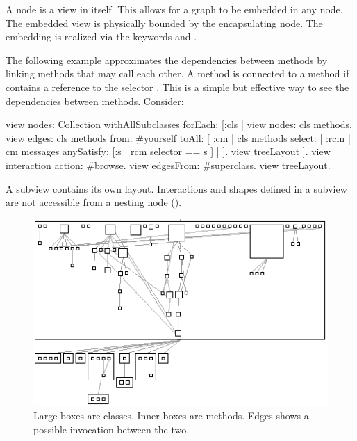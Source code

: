 \documentclass[a4paper,10pt,twoside]{book}
\begin{document}
A node is a view in itself. This allows for a graph to be embedded in any node. The embedded view is physically bounded by the encapsulating node. The embedding is realized via the keywords  and . 

The following example approximates the dependencies between methods by linking methods that may call each other. A method  is connected to a method  if  contains a reference to the selector . This is a simple but effective way to see the dependencies between methods. Consider:

\begin{code}{}
view nodes: Collection withAllSubclasses forEach: [:cls |
	view nodes: cls methods.
	view edges: cls methods from: #yourself toAll: [ :cm | cls methods select: [ :rcm |  cm messages anySatisfy: [:s | rcm selector == s ] ] ].
	view treeLayout
].
view interaction action: #browse.
view edgesFrom: #superclass.
view treeLayout.
\end{code}

A subview contains its own layout. Interactions and shapes defined in a subview are not accessible from a nesting node (). 



\begin{figure}[htbp]
\centerline{\includegraphics[width=0.6\linewidth]{methodDependencies.png}}
\caption{Large boxes are classes. Inner boxes are methods. Edges shows a possible invocation between the two.}
\label{fig:abstractClasses3}
\end{figure}
\end{document}
